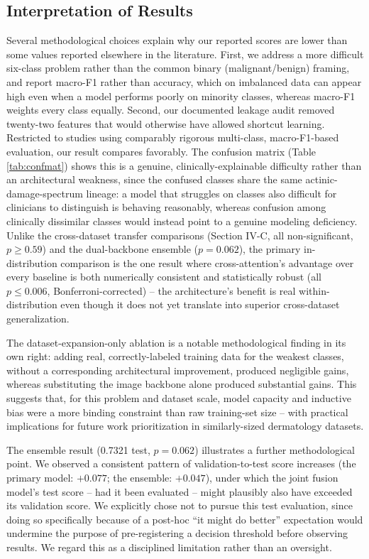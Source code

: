 \documentclass[conference]{IEEEtran}
\begin{document}
\subsection{Interpretation of Results}
Several methodological choices explain why our reported scores are lower than some values reported elsewhere in the literature. First, we address a more difficult six-class problem rather than the common binary (malignant/benign) framing, and report macro-F1 rather than accuracy, which on imbalanced data can appear high even when a model performs poorly on minority classes, whereas macro-F1 weights every class equally. Second, our documented leakage audit removed twenty-two features that would otherwise have allowed shortcut learning. Restricted to studies using comparably rigorous multi-class, macro-F1-based evaluation, our result compares favorably. The confusion matrix (Table \ref{tab:confmat}) shows this is a genuine, clinically-explainable difficulty rather than an architectural weakness, since the confused classes share the same actinic-damage-spectrum lineage: a model that struggles on classes also difficult for clinicians to distinguish is behaving reasonably, whereas confusion among clinically dissimilar classes would instead point to a genuine modeling deficiency. Unlike the cross-dataset transfer comparisons (Section IV-C, all non-significant, $p \geq 0.59$) and the dual-backbone ensemble ($p=0.062$), the primary in-distribution comparison is the one result where cross-attention's advantage over every baseline is both numerically consistent and statistically robust (all $p \leq 0.006$, Bonferroni-corrected) -- the architecture's benefit is real within-distribution even though it does not yet translate into superior cross-dataset generalization.

The dataset-expansion-only ablation is a notable methodological finding in its own right: adding real, correctly-labeled training data for the weakest classes, without a corresponding architectural improvement, produced negligible gains, whereas substituting the image backbone alone produced substantial gains. This suggests that, for this problem and dataset scale, model capacity and inductive bias were a more binding constraint than raw training-set size -- with practical implications for future work prioritization in similarly-sized dermatology datasets.

The ensemble result (0.7321 test, $p=0.062$) illustrates a further methodological point. We observed a consistent pattern of validation-to-test score increases (the primary model: $+0.077$; the ensemble: $+0.047$), under which the joint fusion model's test score -- had it been evaluated -- might plausibly also have exceeded its validation score. We explicitly chose not to pursue this test evaluation, since doing so specifically because of a post-hoc ``it might do better'' expectation would undermine the purpose of pre-registering a decision threshold before observing results. We regard this as a disciplined limitation rather than an oversight.
\end{document}
